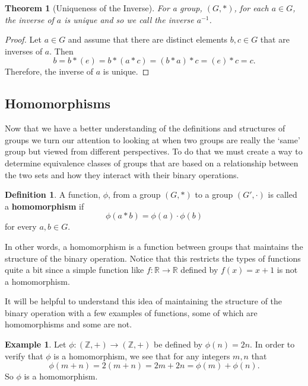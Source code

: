 \documentclass[
]{book}
\newtheorem{theorem}{Theorem}[chapter]
\theoremstyle{definition}
\newtheorem{definition}{Definition}[chapter]
\theoremstyle{definition}
\newtheorem{example}{Example}[chapter]
\theoremstyle{definition}
\theoremstyle{remark}
\begin{document}
\begin{theorem}[Uniqueness of the Inverse]
\protect\hypertarget{thm:unique-inverse}{}{\label{thm:unique-inverse} {} }For a group, \((G,*)\), for each \(a\in G\), the inverse of \(a\) is unique and so we call the inverse \(a^{-1}\).
\end{theorem}

\begin{proof}
{}Let \(a\in G\) and assume that there are distinct elements \(b,c \in G\) that are inverses of \(a\). Then \[b= b * (e)= b* (a*c)= (b*a)*c = (e)*c = c.\] Therefore, the inverse of \(a\) is unique.
\end{proof}

\hypertarget{sec:homomorphisms}{%
\subsection{Homomorphisms}\label{sec:homomorphisms}}

Now that we have a better understanding of the definitions and structures of groups we turn our attention to looking at when two groups are really the `same' group but viewed from different perspectives. To do that we must create a way to determine equivalence classes of groups that are based on a relationship between the two sets and how they interact with their binary operations.

\begin{definition}
\protect\hypertarget{def:unnamed-chunk-156}{}{\label{def:unnamed-chunk-156} }A function, \(\phi\), from a group \((G,*)\) to a group \((G',\cdot)\) is called a \textbf{homomorphism} if \[\phi(a*b)=\phi(a) \cdot \phi(b)\] for every \(a,b\in G\).
\end{definition}

In other words, a homomorphism is a function between groups that maintains the structure of the binary operation. Notice that this restricts the types of functions quite a bit since a simple function like \(f:\mathbb{R} \rightarrow \mathbb{R}\) defined by \(f(x)=x+1\) is not a homomorphism.

It will be helpful to understand this idea of maintaining the structure of the binary operation with a few examples of functions, some of which are homomorphisms and some are not.

\begin{example}
\protect\hypertarget{exm:unnamed-chunk-157}{}{\label{exm:unnamed-chunk-157} }Let \(\phi: (\mathbb{Z},+) \rightarrow (\mathbb{Z},+)\) be defined by \(\phi(n)=2n\). In order to verify that \(\phi\) is a homomorphism, we see that for any integers \(m,n\) that \[\phi(m+n)= 2(m+n) = 2m + 2n = \phi(m)+\phi(n).\] So \(\phi\) is a homomorphism.
\end{example}
\end{document}
